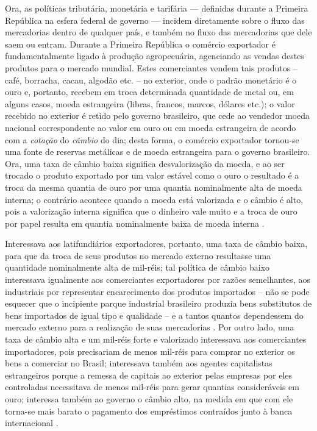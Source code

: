 Ora, as políticas tributária, monetária e tarifária --- definidas durante a Primeira República na esfera federal de governo --- incidem diretamente sobre o fluxo das mercadorias dentro de qualquer país, e também no fluxo das mercadorias que dele saem ou entram. Durante a Primeira República o comércio exportador é fundamentalmente ligado à produção agropecuária, agenciando as vendas destes produtos para o mercado mundial. Estes comerciantes vendem tais produtos -- café, borracha, cacau, algodão etc. -- no exterior, onde o padrão monetário é o ouro e, portanto, recebem em troca determinada quantidade de metal ou, em alguns casos, moeda estrangeira (libras, francos, marcos, dólares etc.); o valor recebido no exterior é retido pelo governo brasileiro, que cede ao vendedor moeda nacional correspondente ao valor em ouro ou em moeda estrangeira de acordo com a \textit{cotação} do \textit{câmbio} do dia; desta forma, o comércio exportador tornou-se uma fonte de reservas metálicas e de moeda estrangeira para o governo brasileiro. Ora, uma taxa de câmbio baixa significa desvalorização da moeda, e ao ser trocado o produto exportado por um valor estável como o ouro o resultado é a troca da mesma quantia de ouro por uma quantia nominalmente alta de moeda interna; o contrário acontece quando a moeda está valorizada e o câmbio é alto, pois a valorização interna significa que o dinheiro vale muito e a troca de ouro por papel resulta em quantia nominalmente baixa de moeda interna \cite[p.~99]{CARONE1970inst}. 

Interessava aos latifundiários exportadores, portanto, uma taxa de câmbio baixa, para que da troca de seus produtos no mercado externo resultasse uma quantidade nominalmente alta de mil-réis; tal política de câmbio baixo interessava igualmente aos comerciantes exportadores por razões semelhantes, aos industriais por representar encarecimento dos produtos importados -- não se pode esquecer que o incipiente parque industrial brasileiro produzia bens substitutos de bens importados de igual tipo e qualidade -- e a tantos quantos dependessem do mercado externo para a realização de suas mercadorias \cite[p.~100]{CARONE1970inst}. Por outro lado, uma taxa de câmbio alta e um mil-réis forte e valorizado interessava aos comerciantes importadores, pois precisariam de menos mil-réis para comprar no exterior os bens a comerciar no Brasil; interessava também aos agentes capitalistas estrangeiros porque a remessa de capitais ao exterior pelas empresas por eles controladas necessitava de menos mil-réis para gerar quantias consideráveis em ouro; interessa também ao governo o câmbio alto, na medida em que com ele torna-se mais barato o pagamento dos empréstimos contraídos junto à banca internacional \cite[p.~100-101]{CARONE1970inst}.

